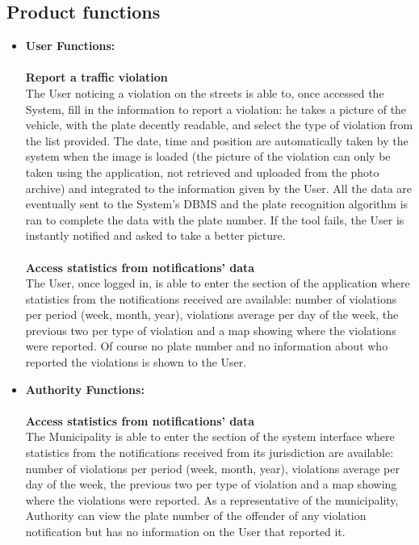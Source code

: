 \documentclass {article}
\begin{document}
	\subsection{Product functions} 
	\begin{itemize}
	\item {\bf User Functions:} \\ \\
		{\bf Report a traffic violation} \\
		The User noticing a violation on the streets is able to, once accessed the System, fill in the information to report a violation: he takes a picture of the vehicle, with the plate decently readable, and select the type of violation from the list provided. The date, time and position are automatically taken by the system when the image is loaded (the picture of the violation can only be taken using the application, not retrieved and uploaded from the photo archive) and integrated to the information given by the User. All the data are eventually sent to the System’s DBMS and the plate recognition algorithm is ran to complete the data with the plate number. If the tool fails, the User is instantly notified and asked to take a better picture. \\ \\ 
		{\bf Access statistics from notifications' data}\\
		The User, once logged in, is able to enter the section of the application where statistics from the notifications received are available: number of violations per period (week, month, year), violations average per day of the week, the previous two per type of violation and a map showing where the violations were reported. Of course no plate number and no information about who reported the violations is shown to the User.\\ 
	\item {\bf Authority Functions:} \\ \\
		{\bf Access statistics from notifications' data}\\
		The Municipality is able to enter the section of the system interface where statistics from the notifications received from its jurisdiction are available: number of violations per period (week, month, year), violations average per day of the week, the previous two per type of violation and a map showing where the violations were reported. As a representative of the municipality, Authority can view the plate number of the offender of any violation notification but has no information on the User that reported it. \\ \\

\end{itemize}
\end{document}
